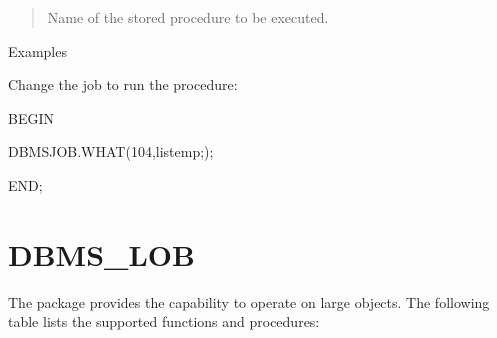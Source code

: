 \documentclass[letterpaper,10pt,english,openany,oneside]{sphinxmanual}
\begin{document}
\begin{quote}

Name of the stored procedure to be executed.
\end{quote}

Examples

Change the job to run the  procedure:

%
\begin{sphinxVerbatim}[commandchars=\\\{\}]
BEGIN

   DBMS\PYGZus{}JOB.WHAT(104,\PYGZsq{}list\PYGZus{}emp;\PYGZsq{});

END;
\end{sphinxVerbatim}

\newpage


\section{DBMS\_LOB}
\label{\detokenize{dbms_lob::doc}}\label{\detokenize{dbms_lob:dbms-lob}}
The  package provides the capability to operate on large
objects. The following table lists the supported functions and
procedures:
\end{document}
